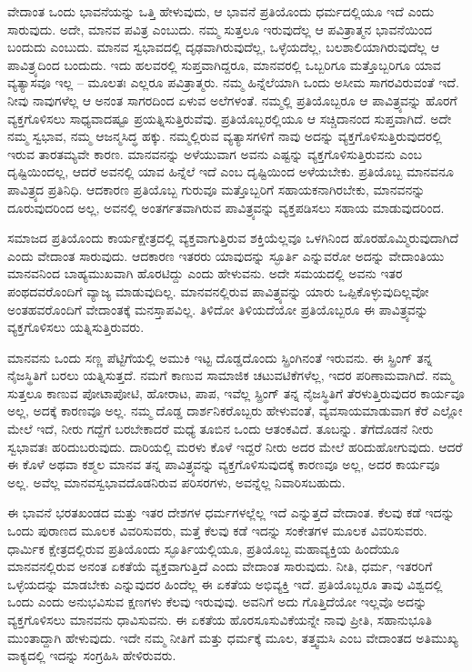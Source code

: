 ವೇದಾಂತ ಒಂದು ಭಾವನೆಯನ್ನು ಒತ್ತಿ ಹೇಳುವುದು, ಆ ಭಾವನೆ ಪ್ರತಿಯೊಂದು ಧರ್ಮದಲ್ಲಿಯೂ ಇದೆ ಎಂದು ಸಾರುವುದು. ಅದೇ, ಮಾನವ ಪವಿತ್ರ ಎಂಬುದು. ನಮ್ಮ ಸುತ್ತಲೂ ಇರುವುದೆಲ್ಲ ಆ ಪವಿತ್ರಾತ್ಮನ ಭಾವನೆಯಿಂದ ಬಂದುದು ಎಂಬುದು. ಮಾನವ ಸ್ವಭಾವದಲ್ಲಿ ದೃಢವಾಗಿರುವುದೆಲ್ಲ, ಒಳ್ಳೆಯದೆಲ್ಲ, ಬಲಶಾಲಿಯಾಗಿರುವುದೆಲ್ಲ ಆ ಪಾವಿತ್ರ್ಯದಿಂದ ಬಂದುದು. ಇದು ಹಲವರಲ್ಲಿ ಸುಪ್ತವಾಗಿದ್ದರೂ, ಮಾನವರಲ್ಲಿ ಒಬ್ಬರಿಗೂ ಮತ್ತೊಬ್ಬರಿಗೂ ಯಾವ ವ್ಯತ್ಯಾಸವೂ ಇಲ್ಲ – ಮೂಲತಃ ಎಲ್ಲರೂ ಪವಿತ್ರಾತ್ಮರು. ನಮ್ಮ ಹಿನ್ನೆಲೆಯಾಗಿ ಒಂದು ಅಸೀಮ ಸಾಗರವಿರುವಂತೆ ಇದೆ. ನೀವು ನಾವುಗಳೆಲ್ಲ ಆ ಅನಂತ ಸಾಗರದಿಂದ ಏಳುವ ಅಲೆಗಳಂತೆ. ನಮ್ಮಲ್ಲಿ ಪ್ರತಿಯೊಬ್ಬರೂ ಆ ಪಾವಿತ್ರ್ಯವನ್ನು ಹೊರಗೆ ವ್ಯಕ್ತಗೊಳಿಸಲು ಸಾಧ್ಯವಾದಷ್ಟೂ ಪ್ರಯತ್ನಿಸುತ್ತಿರುವೆವು. ಪ್ರತಿಯೊಬ್ಬರಲ್ಲಿಯೂ ಆ ಸಚ್ಚಿದಾನಂದ ಸುಪ್ತವಾಗಿದೆ. ಅದೇ ನಮ್ಮ ಸ್ವಭಾವ, ನಮ್ಮ ಆಜನ್ಮಸಿದ್ಧ ಹಕ್ಕು. ನಮ್ಮಲ್ಲಿರುವ ವ್ಯತ್ಯಾಸಗಳಿಗೆ ನಾವು ಅದನ್ನು ವ್ಯಕ್ತಗೊಳಿಸುತ್ತಿರುವುದರಲ್ಲಿ ಇರುವ ತಾರತಮ್ಯವೇ ಕಾರಣ. ಮಾನವನನ್ನು ಅಳೆಯುವಾಗ ಅವನು ಎಷ್ಟನ್ನು ವ್ಯಕ್ತಗೊಳಿಸುತ್ತಿರುವನು ಎಂಬ ದೃಷ್ಟಿಯಿಂದಲ್ಲ, ಆದರೆ ಅವನಲ್ಲಿ ಯಾವ ಹಿನ್ನೆಲೆ ಇದೆ ಎಂಬ ದೃಷ್ಟಿಯಿಂದ ಅಳೆಯಬೇಕು. ಪ್ರತಿಯೊಬ್ಬ ಮಾನವನೂ ಪಾವಿತ್ರ್ಯದ ಪ್ರತಿನಿಧಿ. ಆದಕಾರಣ ಪ್ರತಿಯೊಬ್ಬ ಗುರುವೂ ಮತ್ತೊಬ್ಬರಿಗೆ ಸಹಾಯಕನಾಗಿರಬೇಕು, ಮಾನವನನ್ನು ದೂರುವುದರಿಂದ ಅಲ್ಲ, ಅವನಲ್ಲಿ ಅಂತರ್ಗತವಾಗಿರುವ ಪಾವಿತ್ರ್ಯವನ್ನು ವ್ಯಕ್ತಪಡಿಸಲು ಸಹಾಯ ಮಾಡುವುದರಿಂದ.

\vskip 3pt

ಸಮಾಜದ ಪ್ರತಿಯೊಂದು ಕಾರ್ಯಕ್ಷೇತ್ರದಲ್ಲಿ ವ್ಯಕ್ತವಾಗುತ್ತಿರುವ ಶಕ್ತಿಯೆಲ್ಲವೂ ಒಳಗಿನಿಂದ ಹೊರಹೊಮ್ಮಿರುವುದಾಗಿದೆ ಎಂದು ವೇದಾಂತ ಸಾರುವುದು. ಆದಕಾರಣ ಇತರರು ಯಾವುದನ್ನು ಸ್ಫೂರ್ತಿ ಎನ್ನುವರೋ ಅದನ್ನು ವೇದಾಂತಿಯು ಮಾನವನಿಂದ ಬಾಹ್ಯಮುಖವಾಗಿ ಹೊರಟಿದ್ದು ಎಂದು ಹೇಳುವನು. ಅದೇ ಸಮಯದಲ್ಲಿ ಅವನು ಇತರ ಪಂಥದವರೊಂದಿಗೆ ವ್ಯಾಜ್ಯ ಮಾಡುವುದಿಲ್ಲ. ಮಾನವನಲ್ಲಿರುವ ಪಾವಿತ್ರ್ಯವನ್ನು ಯಾರು ಒಪ್ಪಿಕೊಳ್ಳುವುದಿಲ್ಲವೋ ಅಂತಹವರೊಂದಿಗೆ ವೇದಾಂತಕ್ಕೆ ಮನಸ್ತಾಪವಿಲ್ಲ. ತಿಳಿದೋ ತಿಳಿಯದೆಯೋ ಪ್ರತಿಯೊಬ್ಬರೂ ಈ ಪಾವಿತ್ರ್ಯವನ್ನು ವ್ಯಕ್ತಗೊಳಿಸಲು ಯತ್ನಿಸುತ್ತಿರುವರು.

\vskip 3pt

ಮಾನವನು ಒಂದು ಸಣ್ಣ ಪೆಟ್ಟಿಗೆಯಲ್ಲಿ ಅಮುಕಿ ಇಟ್ಟ ದೊಡ್ಡದೊಂದು ಸ್ಪ್ರಿಂಗಿನಂತೆ ಇರುವನು. ಈ ಸ್ಪ್ರಿಂಗ್ ತನ್ನ ನೈಜಸ್ಥಿತಿಗೆ ಬರಲು ಯತ್ನಿಸುತ್ತದೆ. ನಮಗೆ ಕಾಣುವ ಸಾಮಾಜಿಕ ಚಟುವಟಿಕೆಗಳೆಲ್ಲ, ಇದರ ಪರಿಣಾಮವಾಗಿದೆ. ನಮ್ಮ ಸುತ್ತಲೂ ಕಾಣುವ ಪೋಟಾಪೋಟಿ, ಹೋರಾಟ, ಪಾಪ, ಇವೆಲ್ಲ ಸ್ಪ್ರಿಂಗ್ ತನ್ನ ನೈಜಸ್ಥಿತಿಗೆ ತೆರಳುತ್ತಿರುವುದರ ಕಾರ್ಯವೂ ಅಲ್ಲ, ಅದಕ್ಕೆ ಕಾರಣವೂ ಅಲ್ಲ. ನಮ್ಮ ದೊಡ್ಡ ದಾರ್ಶನಿಕರೊಬ್ಬರು ಹೇಳುವಂತೆ, ವ್ಯವಸಾಯಮಾಡುವಾಗ ಕೆರೆ ಎಲ್ಲೋ ಮೇಲೆ ಇದೆ, ನೀರು ಗದ್ದೆಗೆ ಬರಬೇಕಾದರೆ ಮಧ್ಯೆ ತೂಬಿನ ಒಂದು ಆತಂಕವಿದೆ. ತೂಬನ್ನು. ತೆಗೆದೊಡನೆ ನೀರು ಸ್ವಭಾವತಃ ಹರಿದುಬರುವುದು. ದಾರಿಯಲ್ಲಿ ಮರಳು ಕೊಳೆ ಇದ್ದರೆ ನೀರು ಅದರ ಮೇಲೆ ಹರಿದುಹೋಗುವುದು. ಆದರೆ ಈ ಕೊಳೆ ಅಥವಾ ಕಶ್ಮಲ ಮಾನವ ತನ್ನ ಪಾವಿತ್ರ್ಯವನ್ನು ವ್ಯಕ್ತಗೊಳಿಸುವುದಕ್ಕೆ ಕಾರಣವೂ ಅಲ್ಲ, ಅದರ ಕಾರ್ಯವೂ ಅಲ್ಲ. ಅವೆಲ್ಲ ಮಾನವಸ್ವಭಾವದೊಡನಿರುವ ಪರಿಸರಗಳು, ಅವನ್ನೆಲ್ಲ ನಿವಾರಿಸಬಹುದು.

\vskip 3pt

ಈ ಭಾವನೆ ಭರತಖಂಡದ ಮತ್ತು ಇತರ ದೇಶಗಳ ಧರ್ಮಗಳಲ್ಲೆಲ್ಲ ಇದೆ ಎನ್ನುತ್ತದೆ ವೇದಾಂತ. ಕೆಲವು ಕಡೆ ಇದನ್ನು ಒಂದು ಪುರಾಣದ ಮೂಲಕ ವಿವರಿಸುವರು, ಮತ್ತೆ ಕೆಲವು ಕಡೆ ಇದನ್ನು ಸಂಕೇತಗಳ ಮೂಲಕ ವಿವರಿಸುವರು. ಧಾರ್ಮಿಕ ಕ್ಷೇತ್ರದಲ್ಲಿರುವ ಪ್ರತಿಯೊಂದು ಸ್ಫೂರ್ತಿಯಲ್ಲಿಯೂ, ಪ್ರತಿಯೊಬ್ಬ ಮಹಾವ್ಯಕ್ತಿಯ ಹಿಂದೆಯೂ ಮಾನವನಲ್ಲಿರುವ ಅನಂತ ಏಕತೆಯೆ ವ್ಯಕ್ತವಾಗುತ್ತಿದೆ ಎಂದು ವೇದಾಂತ ಸಾರುವುದು. ನೀತಿ, ಧರ್ಮ, ಇತರರಿಗೆ ಒಳ್ಳೆಯದನ್ನು ಮಾಡಬೇಕು ಎನ್ನುವುದರ ಹಿಂದೆಲ್ಲ ಈ ಏಕತೆಯ ಅಭಿವ್ಯಕ್ತಿ ಇದೆ. ಪ್ರತಿಯೊಬ್ಬರೂ ತಾವು ವಿಶ್ವದಲ್ಲಿ ಒಂದು ಎಂದು ಅನುಭವಿಸುವ ಕ್ಷಣಗಳು ಕೆಲವು ಇರುವುವು. ಅವನಿಗೆ ಅದು ಗೊತ್ತಿದೆಯೋ ಇಲ್ಲವೊ ಅದನ್ನು ವ್ಯಕ್ತಗೊಳಿಸಲು ಮಾನವನು ಧಾವಿಸುವನು. ಈ ಏಕತೆಯ ಹೊರಸೂಸುವಿಕೆಯನ್ನೇ ನಾವು ಪ್ರೀತಿ, ಸಹಾನುಭೂತಿ ಮುಂತಾದ್ದಾಗಿ ಹೇಳುವುದು. ಇದೇ ನಮ್ಮ ನೀತಿಗೆ ಮತ್ತು ಧರ್ಮಕ್ಕೆ ಮೂಲ, ತತ್ತ್ವಮಸಿ ಎಂಬ ವೇದಾಂತದ ಅತಿಮುಖ್ಯ ವಾಕ್ಯದಲ್ಲಿ ಇದನ್ನು ಸಂಗ್ರಹಿಸಿ ಹೇಳಿರುವರು.

